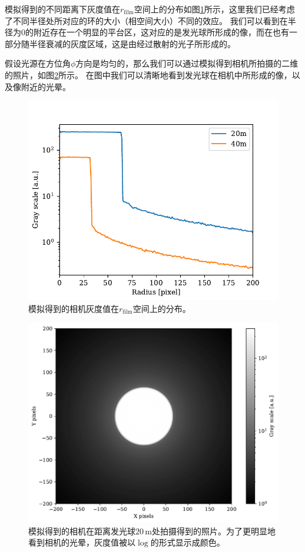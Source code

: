 模拟得到的不同距离下灰度值在$r_\mathrm{film}$空间上的分布如图\ref{fig:pathfinder_sim_cam_gray_dist}所示，这里我们已经考虑了不同半径处所对应的环的大小（相空间大小）不同的效应。
我们可以看到在半径为0的附近存在一个明显的平台区，这对应的是发光球所形成的像，而在也有一部分随半径衰减的灰度区域，这是由经过散射的光子所形成的。

假设光源在方位角$\phi$方向是均匀的，那么我们可以通过模拟得到相机所拍摄的二维的照片，如图\ref{fig:pathfinder_sim_cam_img}所示。
在图中我们可以清晰地看到发光球在相机中所形成的像，以及像附近的光晕。

\begin{figure}[htb]
    \centering
    \includegraphics[width=0.75\linewidth]{img/pathfinder_sim_cam_gray_dist.pdf}
    \caption{模拟得到的相机灰度值在$r_\mathrm{film}$空间上的分布。}
    \label{fig:pathfinder_sim_cam_gray_dist}
\end{figure}

\begin{figure}[htb]
    \centering
    \includegraphics[width=0.75\linewidth]{img/pathfinder_sim_cam_img.pdf}
    \caption{模拟得到的相机在距离发光球$20\,\mathrm{m}$处拍摄得到的照片。为了更明显地看到相机的光晕，灰度值被以$\log$的形式显示成颜色。}
    \label{fig:pathfinder_sim_cam_img}
\end{figure}


